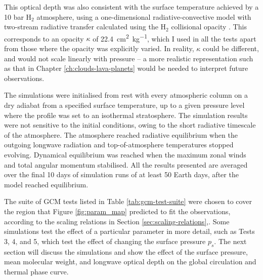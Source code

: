 This optical depth was also consistent with the surface temperature achieved by a 10 bar $\mathrm{H_2}$ atmosphere, using a one-dimensional radiative-convective model with two-stream radiative transfer calculated using the $\mathrm{H_2}$ collisional opacity \citep{pierrehumbert2011hydrogen}. This corresponds to an opacity $\kappa$ of \SI{22.4}{\cm\squared\per\kg}, which I used in all the tests apart from those where the opacity was explicitly varied. In reality, $\kappa$ could be different, and would not scale linearly with pressure -- a more realistic representation such as that in Chapter \ref{ch:clouds-lava-planets} would be needed to interpret future observations.

The simulations were initialised from rest with every atmospheric column on a dry adiabat from a specified surface temperature, up to a given pressure level where the profile was set to an isothermal stratosphere. The simulation results were not sensitive to the initial conditions, owing to the short radiative timescale of the atmosphere. The atmosphere reached radiative equilibrium when the outgoing longwave radiation and top-of-atmosphere temperatures stopped evolving. Dynamical equilibrium was reached when the maximum zonal winds and total angular momentum stabilised. All the results presented are averaged over the final 10 days of simulation runs of at least 50 Earth days, after the model reached equilibrium.



The suite of GCM tests listed in Table \ref{tab:gcm-test-suite} were chosen to cover the region that Figure \ref{fig:param_map} predicted to fit the observations, according to the scaling relations in Section \ref{sec:scaling-relations},. Some simulations test the effect of a particular parameter in more detail, such as Tests 3, 4, and 5, which test the effect of changing the surface pressure $p_{s}$. The next section will discuss the simulations and show the effect of the surface pressure, mean molecular weight, and longwave optical depth on the global circulation and thermal phase curve.


